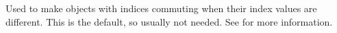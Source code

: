 
Used to make objects with indices commuting when their index values
are different. This is the default, so usually not
needed. See  for more information.

